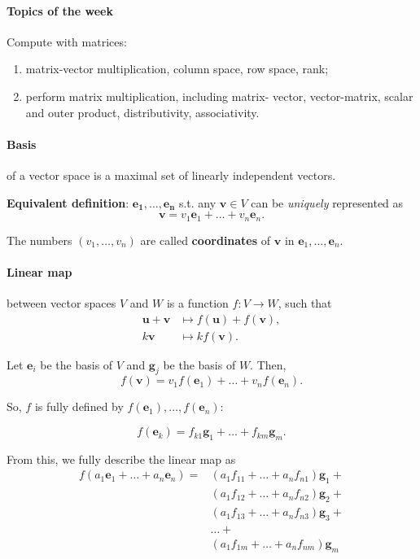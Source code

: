 \documentclass{article}
\begin{document}
\paragraph{Topics of the week} Compute with matrices:  

\begin{enumerate}
    \item matrix-vector multiplication, column space, row space, rank;
    \item perform matrix multiplication, including matrix- vector, vector-matrix, scalar and outer product, distributivity, associativity.
\end{enumerate}

\paragraph{Basis} of a vector space is a maximal set of linearly independent vectors.

\textbf{Equivalent definition}: $\mathbf{e_1}, \dots, \mathbf{e_n}$ s.t. any $\mathbf v \in V$ can be \textit{uniquely} represented as
$$
\mathbf v = v_1 \mathbf e_1 + \dots + v_n \mathbf e_n.
$$

The numbers $(v_1,\dots,v_n)$ are called \textbf{coordinates} of $\mathbf v$ in $\mathbf e_1,\dots,\mathbf e_n$.

\paragraph{Linear map} between vector spaces $V$ and $W$ is a function $f : V \to W$, such that
\begin{align*}
\mathbf u + \mathbf v &\mapsto f(\mathbf u) + f(\mathbf v), \\
k \mathbf v  &\mapsto k f(\mathbf v).
\end{align*}

Let $\mathbf e_i$ be the basis of $V$ and $\mathbf g_j$ be the basis of $W$. Then,
$$
f(\mathbf v) = v_1 f(\mathbf e_1) + \dots + v_n f(\mathbf e_n).
$$

So, $f$ is fully defined by $f(\mathbf e_1), \dots, f(\mathbf e_n)$:

$$
f(\mathbf e_k) = f_{k1} \mathbf g_1 + \dots + f_{km} \mathbf g_m.
$$

From this, we fully describe the linear map as
\begin{align*}
f(a_1 \mathbf e_1 + \dots + a_n \mathbf e_n) =& (a_1 f_{11} + \dots + a_n f_{n1}) \mathbf g_1 + \\
& (a_1 f_{12} + \dots + a_n f_{n2}) \mathbf g_2 + \\
& (a_1 f_{13} + \dots + a_n f_{n3}) \mathbf g_3 + \\
& \dots + \\
& (a_1 f_{1m} + \dots + a_n f_{nm}) \mathbf g_m \\
\end{align*}
\end{document}

